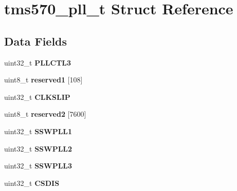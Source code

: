 \hypertarget{structtms570__pll__t}{}\section{tms570\+\_\+pll\+\_\+t Struct Reference}
\label{structtms570__pll__t}
\subsection*{Data Fields}
\begin{DoxyCompactItemize}
\item 
\mbox{\label{structtms570__pll__t_a6e675ac853ac2993596ddce843b1255a}} 
uint32\+\_\+t {\bfseries P\+L\+L\+C\+T\+L3}
\item 
\mbox{\label{structtms570__pll__t_a5416af8d09ba12216f7f198df97e0aa4}} 
uint8\+\_\+t {\bfseries reserved1} \mbox{[}108\mbox{]}
\item 
\mbox{\label{structtms570__pll__t_a4f2aed401b4314edcb856dfbc807fcd2}} 
uint32\+\_\+t {\bfseries C\+L\+K\+S\+L\+IP}
\item 
\mbox{\label{structtms570__pll__t_ab708fa370a7c7d44313f5d0f0f47a40d}} 
uint8\+\_\+t {\bfseries reserved2} \mbox{[}7600\mbox{]}
\item 
\mbox{\label{structtms570__pll__t_aed1021e97d8819c419f84c68d721c615}} 
uint32\+\_\+t {\bfseries S\+S\+W\+P\+L\+L1}
\item 
\mbox{\label{structtms570__pll__t_a20b75e797e1005de7be3c49cabc8d950}} 
uint32\+\_\+t {\bfseries S\+S\+W\+P\+L\+L2}
\item 
\mbox{\label{structtms570__pll__t_aa943294ade2ebadbde68d3114a6995cc}} 
uint32\+\_\+t {\bfseries S\+S\+W\+P\+L\+L3}
\item 
\mbox{\label{structtms570__pll__t_aa925cabea56b2b05b1d9f0bbf391c1ea}} 
uint32\+\_\+t {\bfseries C\+S\+D\+IS}
\item 
\mbox{\label{structtms570__pll__t_aa0b52cdba02ea4e9522a8e4e69bb81c0}} 

\end{DoxyCompactItemize}
